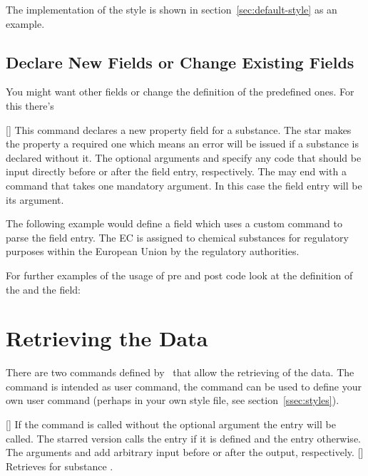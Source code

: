 \documentclass[load-preamble+]{cnltx-doc}
\begin{document}
The implementation of the  style is shown in
section~\ref{sec:default-style} as an example.

\subsection{Declare New Fields or Change Existing Fields}\label{sec:declare-new-fields}
You might want other fields or change the definition of the predefined ones.
For this there's
\begin{commands}
  [\sarg{}]
    This command declares a new property field for a substance. The star makes
    the property a required one which means an error will be issued if a
    substance is declared without it. The optional arguments 
    and  specify any code that should be input directly before
    or after the field entry, respectively. The  may end with a
    command that takes one mandatory argument. In this case the field entry
    will be its argument.
\end{commands}

The following example would define a field  which uses a custom
command to parse the field entry. The \ac{EC} is assigned to chemical
substances for regulatory purposes within the European Union by the regulatory
authorities.
For further examples of the usage of pre and post code look at the definition of
the  and the  field:

\section{Retrieving the Data}
There are two commands defined by \substances\ that allow the retrieving of
the data. The command  is intended as user command, the command
 can be used to define your own user command (perhaps
in your own style file, see section~\ref{ssec:styles}).
\begin{commands}
  [\sarg{}]
    If the command  is called without the optional 
    argument the  entry will be called. The starred version calls
    the  entry if it is defined and the  entry
    otherwise. The arguments  and  add arbitrary input
    before or after the output, respectively.
  []
    Retrieves  for substance .
\end{commands}
\end{document}
